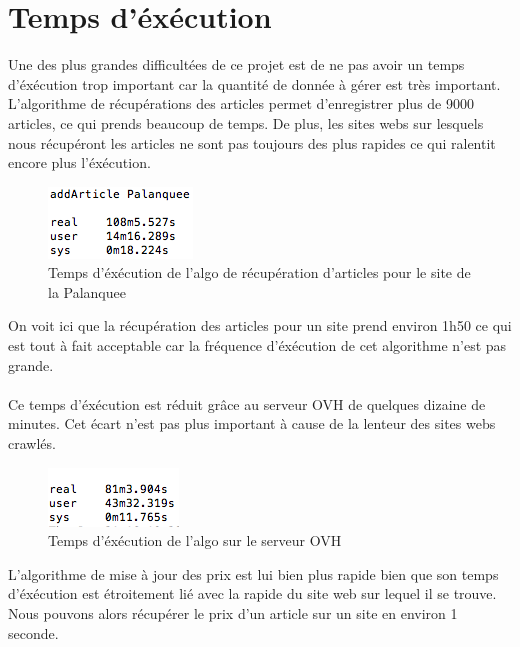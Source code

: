 \documentclass{report}
\begin{document}
\section{Temps d'éxécution}
Une des plus grandes difficultées de ce projet est de ne pas avoir un temps d'éxécution trop important car la quantité de donnée à gérer est très important.\\
L'algorithme de récupérations des articles permet d'enregistrer plus de 9000 articles, ce qui prends beaucoup de temps. De plus, les sites webs sur lesquels nous récupéront les articles ne sont pas toujours des plus rapides ce qui ralentit encore plus l'éxécution.\\
\begin{figure}[h]
\begin{center}
\includegraphics[scale = 0.7]{./img/palanquee1.png}
\caption{Temps d'éxécution de l'algo de récupération d'articles pour le site de la Palanquee}
\end{center}
\end{figure}
On voit ici que la récupération des articles pour un site prend environ 1h50 ce qui est tout à fait acceptable car la fréquence d'éxécution de cet algorithme n'est pas grande.\\\\
Ce temps d'éxécution est réduit grâce au serveur OVH de quelques dizaine de minutes. Cet écart n'est pas plus important à cause de la lenteur des sites webs crawlés.\\
\begin{figure}[h]
\begin{center}
\includegraphics[scale = 0.7]{./img/palanquee2.png}
\caption{Temps d'éxécution de l'algo sur le serveur OVH}
\end{center}
\end{figure}

L'algorithme de mise à jour des prix est lui bien plus rapide bien que son temps d'éxécution est étroitement lié avec la rapide du site web sur lequel il se trouve. Nous pouvons alors récupérer le prix d'un article sur un site en environ 1 seconde.\\\\
\end{document}
